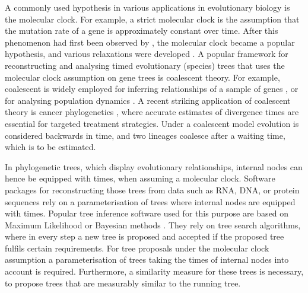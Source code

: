 \documentclass[11pt]{amsart}
\newcommand{\summary}[1]{} %
\begin{document}
\summary{Molecular clock, divergence dating, and coalescent -- biological motivation}
A commonly used hypothesis in various applications in evolutionary biology is the molecular clock.
For example, a strict molecular clock is the assumption that the mutation rate of a gene is approximately constant over time.
After this phenomenon had first been observed by \textcite{zuckerkandl1965evolutionary}, the molecular clock became a popular hypothesis, and various relaxations were developed \autocite{Kumar2016-eu}.
A popular framework for reconstructing and analysing timed evolutionary (species) trees \autocite{Kingman1982-df} that uses the molecular clock assumption on gene trees is coalescent theory.
For example, coalescent is widely employed for inferring relationships of a sample of genes \autocite{Hudson1990-ki, Kuhner2009-jb}, or for analysing population dynamics \autocite{Kuhner1998-eh,Drummond2005-ak}.
A recent striking application of coalescent theory is cancer phylogenetics \autocite{Posada2020-aa, Ohtsuki2017-su}, where accurate estimates of divergence times are essential for targeted treatment strategies.
Under a coalescent model evolution is considered backwards in time, and two lineages coalesce after a waiting time, which is to be estimated.

\summary{Software needs to deal with clock trees, tree proposals}
In phylogenetic trees, which display evolutionary relationships, internal nodes can hence be equipped with times, when assuming a molecular clock.
Software packages for reconstructing those trees from data such as RNA, DNA, or protein sequences rely on a parameterisation of trees where internal nodes are equipped with times.
Popular tree inference software used for this purpose are based on Maximum Likelihood \autocite{Kozlov2019-cf, Nguyen2015-sp, Tamura2011-ky} or Bayesian methods \autocite{Bouckaert2014-ir,Suchard2018-tw, Ronquist2003-eq}.
They rely on tree search algorithms, where in every step a new tree is proposed and accepted if the proposed tree fulfils certain requirements.
For tree proposals under the molecular clock assumption a parameterisation of trees taking the times of internal nodes into account is required.
Furthermore, a similarity measure for these trees is necessary, to propose trees that are measurably similar to the running tree.
\end{document}
